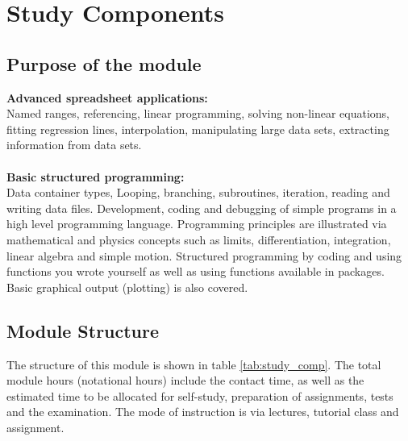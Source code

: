 \section{Study Components}
    \subsection{Purpose of the module}
    {\bf Advanced spreadsheet applications:} \\
    Named ranges, referencing, linear programming, solving non-linear
    equations, fitting regression lines, interpolation, manipulating
    large data sets, extracting information from data sets. \\ \\
    {\bf Basic structured programming:} \\
    Data container types, Looping, branching, subroutines, iteration,
    reading and writing data files. Development, coding and debugging
    of simple programs in a high level programming
    language. Programming principles are illustrated via mathematical
    and physics concepts such as limits, differentiation, integration,
    linear algebra and simple motion. Structured programming by coding
    and using functions you wrote yourself as well as using functions
    available in packages. Basic graphical output (plotting) is also
    covered.

    \subsection{Module Structure}
        The structure of this module is shown in table \ref{tab:study_comp}.
        The total module hours (notational hours) include the contact time,
        as well as the estimated time to be allocated for self-study,
        preparation of assignments, tests and the examination. The mode of
        instruction is via lectures, tutorial class and assignment. \\

